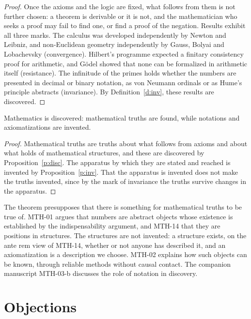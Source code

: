 \documentclass{situationist-preprint}
\begin{document}
\begin{proof}
Once the axioms and the logic are fixed, what follows from them is not further chosen: a theorem is derivable or it is not, and the mathematician who seeks a proof may fail to find one, or find a proof of the negation. Results exhibit all three marks. The calculus was developed independently by Newton and Leibniz, and non-Euclidean geometry independently by Gauss, Bolyai and Lobachevsky (convergence). Hilbert's programme expected a finitary consistency proof for arithmetic, and Gödel showed that none can be formalized in arithmetic itself (resistance). The infinitude of the primes holds whether the numbers are presented in decimal or binary notation, as von Neumann ordinals or as Hume's principle abstracts (invariance). By Definition~\ref{d:inv}, these results are discovered.
\end{proof}

\begin{theorem}\label{t:main}
Mathematics is discovered: mathematical truths are found, while notations and axiomatizations are invented.
\end{theorem}

\begin{proof}
Mathematical truths are truths about what follows from axioms and about what holds of mathematical structures, and these are discovered by Proposition~\ref{p:disc}. The apparatus by which they are stated and reached is invented by Proposition~\ref{p:inv}. That the apparatus is invented does not make the truths invented, since by the mark of invariance the truths survive changes in the apparatus.
\end{proof}

The theorem presupposes that there is something for mathematical truths to be true of. MTH-01 argues that numbers are abstract objects whose existence is established by the indispensability argument, and MTH-14 that they are positions in structures. The structures are not invented: a structure exists, on the ante rem view of MTH-14, whether or not anyone has described it, and an axiomatization is a description we choose. MTH-02 explains how such objects can be known, through reliable methods without causal contact. The companion manuscript MTH-03-b discusses the role of notation in discovery.

\section{Objections}
\end{document}
